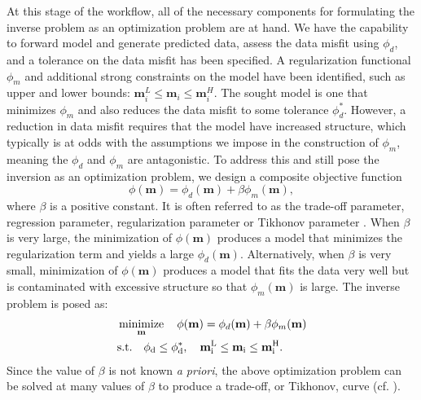 \documentclass[preprint,review,3p,times,onecolumn,authoryear]{elsarticle}
\newcommand{\m}{\mathbf{m}}
\newcommand{\minimize}[1]{\mathop{\hbox{minimize}}_{#1}}
\begin{document}
At this stage of the workflow, all of the necessary components for formulating the inverse
problem as an optimization problem are at hand. We have the capability to forward model and generate predicted
data, assess the data misfit using $\phi_d$, and a tolerance on the data misfit has been specified.
A regularization functional $\phi_m$ and additional strong constraints
on the model have been identified, such as upper and lower bounds:
$\m^L_i \le \m_i \le \m^H_i$.
The sought model is one that minimizes $\phi_m$
and also reduces the data misfit to some tolerance $\phi_d^*$. However, a reduction in data misfit
requires that the model have increased structure, which typically is at odds with the assumptions we impose in the construction of $\phi_m$, meaning the $\phi_d$ and $\phi_m$ are antagonistic.
To address this and still pose the inversion as an optimization problem, we design a composite objective function
{%
\begin{equation}
\label{eq:Phi}
\phi(\m) = \phi_d(\m) + \beta \phi_m(\m),
\end{equation}
}
where $\beta$ is a positive constant. It is often referred to as the
trade-off parameter, regression parameter, regularization parameter or Tikhonov parameter \citep{TikhonovA.N.1977}.
When $\beta$ is very large, the minimization of $\phi(\m)$ produces a model that minimizes the
regularization term and yields a large $\phi_d(\m)$. Alternatively, when $\beta$ is
very small, minimization of $\phi(\m)$ produces a model that fits the data very
well but is contaminated with excessive structure so that $\phi_m(\m)$ is large.
The inverse problem is posed as:
{%
\begin{equation}
\label{eq:invoptimization}
	\begin{split}
	&\minimize{\m} \quad  \phi(\m) = \phi_d(\m) + \beta \phi_m(\m) \\
	&\rm{s.t.}  \quad  \phi_d \le \phi_d^*, \quad \m^L_i \le \m_i \le \m^H_i.
       \end{split}
\end{equation}
}
Since the value of $\beta$ is not known \emph{a priori}, the above optimization problem can be solved at many
values of $\beta$ to produce a trade-off, or Tikhonov, curve (cf. \cite{parker1994geophysical,hansen1998rank}).
\end{document}

